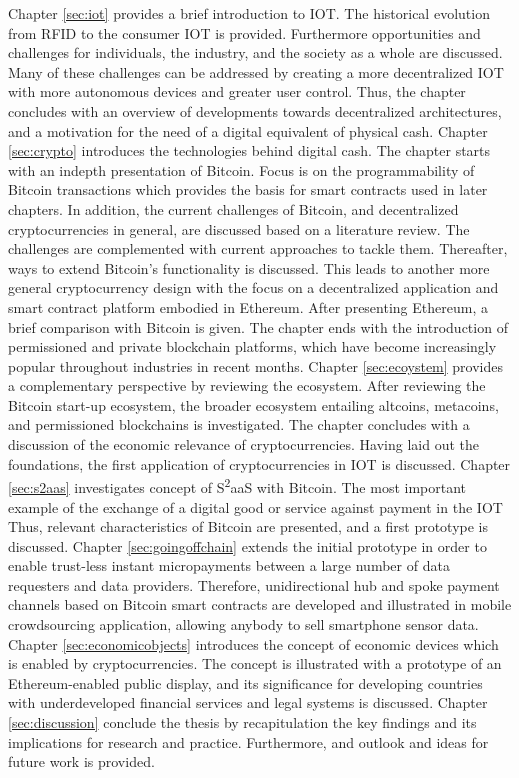 Chapter \ref{sec:iot} provides a brief introduction to \ac{IOT}. The historical evolution from \ac{RFID} to the consumer \ac{IOT} is provided. Furthermore opportunities and challenges for individuals, the industry, and the society as a whole are discussed. Many of these challenges can be addressed by creating a more decentralized \ac{IOT} with more autonomous devices and greater user control. Thus, the chapter concludes with an overview of developments towards decentralized architectures, and a motivation for the need of a digital equivalent of physical cash. Chapter \ref{sec:crypto} introduces the technologies behind digital cash. The chapter starts with an indepth presentation of Bitcoin. Focus is on the programmability of Bitcoin transactions which provides the basis for smart contracts used in later chapters. In addition, the current challenges of Bitcoin, and decentralized cryptocurrencies in general, are discussed based on a literature review. The challenges are complemented with current approaches to tackle them. 
Thereafter, ways to extend Bitcoin's functionality is discussed. This leads to another more general cryptocurrency design with the focus on a decentralized application and smart contract platform embodied in Ethereum. After presenting Ethereum, a brief comparison with Bitcoin is given. The chapter ends with the introduction of permissioned and private blockchain platforms, which have become increasingly popular throughout industries in recent months. Chapter \ref{sec:ecoystem} provides a complementary perspective by reviewing the ecosystem. After reviewing the Bitcoin start-up ecosystem, the broader ecosystem entailing altcoins, metacoins, and permissioned blockchains is investigated. The chapter concludes with a discussion of the economic relevance of cryptocurrencies. Having laid out the foundations, the first application of cryptocurrencies in \ac{IOT} is discussed. Chapter \ref{sec:s2aas} investigates concept of S\textsuperscript{2}aaS with Bitcoin. The most important example of the exchange of a digital good or service against payment in the \ac{IOT} Thus, relevant characteristics of Bitcoin are presented, and a first prototype is discussed. Chapter \ref{sec:goingoffchain} extends the initial prototype in order to enable trust-less instant micropayments between a large number of data requesters and data providers. Therefore, unidirectional hub and spoke payment channels based on Bitcoin smart contracts are developed and illustrated in mobile crowdsourcing application, allowing anybody to sell smartphone sensor data. Chapter \ref{sec:economicobjects} introduces the concept of economic devices which is enabled by cryptocurrencies. The concept is illustrated with a prototype of an Ethereum-enabled public display, and its significance for developing countries with underdeveloped financial services and legal systems is discussed. Chapter \ref{sec:discussion} conclude the thesis by recapitulation the key findings and its implications for research and practice. Furthermore, and outlook and ideas for future work is provided.

